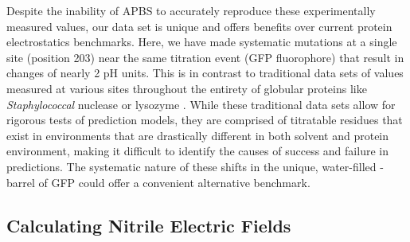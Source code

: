 Despite the inability of APBS to accurately reproduce these experimentally measured \pKa{} values, our data set is unique and offers benefits over current protein electrostatics benchmarks.
Here, we have made systematic mutations at a single site (position 203) near the same titration event (GFP fluorophore) that result in \pKa{} changes of nearly 2 pH units.
This is in contrast to traditional data sets of \pKa{} values measured at various sites throughout the entirety of globular proteins like \emph{Staphylococcal} nuclease or lysozyme \cite{Nielsen2011, Castaneda2009, Merz1991}.
While these traditional data sets allow for rigorous tests of \pKa{} prediction models, they are comprised of titratable residues that exist in environments that are drastically different in both solvent and protein environment, making it difficult to identify the causes of success and failure in \pKa{} predictions.
The systematic nature of these \pKa{} shifts in the unique, water-filled \textbeta{}-barrel of GFP could offer a convenient alternative benchmark. 

\subsection{Calculating Nitrile Electric Fields}

